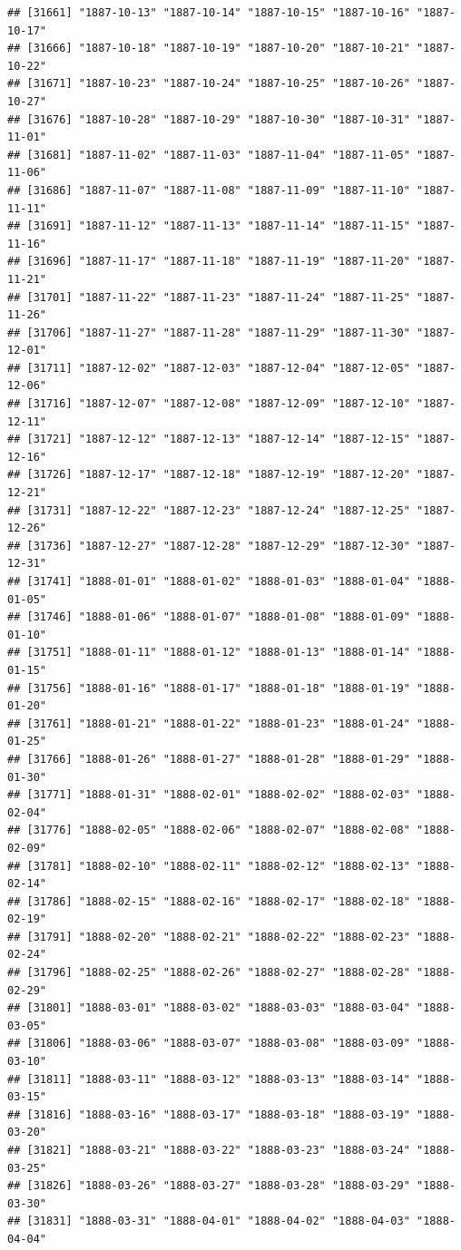 \documentclass{article}\usepackage[]{graphicx}\usepackage[]{color}
\makeatletter
\newenvironment{kframe}{%
 \def\at@end@of@kframe{}%
 \ifinner\ifhmode%
  \def\at@end@of@kframe{\end{minipage}}%
  \begin{minipage}{\columnwidth}%
 \fi\fi%
 \def\FrameCommand##1{\hskip\@totalleftmargin \hskip-\fboxsep
 \colorbox{shadecolor}{##1}\hskip-\fboxsep
     \hskip-\linewidth \hskip-\@totalleftmargin \hskip\columnwidth}%
 \MakeFramed {\advance\hsize-\width
   \@totalleftmargin\z@ \linewidth\hsize
   \@setminipage}}%
 {\par\unskip\endMakeFramed%
 \at@end@of@kframe}
\newenvironment{knitrout}{}{} %
\makeatother
\begin{document}
\begin{description}
\begin{knitrout}
\begin{kframe}
\begin{verbatim}
## [31661] "1887-10-13" "1887-10-14" "1887-10-15" "1887-10-16" "1887-10-17"
## [31666] "1887-10-18" "1887-10-19" "1887-10-20" "1887-10-21" "1887-10-22"
## [31671] "1887-10-23" "1887-10-24" "1887-10-25" "1887-10-26" "1887-10-27"
## [31676] "1887-10-28" "1887-10-29" "1887-10-30" "1887-10-31" "1887-11-01"
## [31681] "1887-11-02" "1887-11-03" "1887-11-04" "1887-11-05" "1887-11-06"
## [31686] "1887-11-07" "1887-11-08" "1887-11-09" "1887-11-10" "1887-11-11"
## [31691] "1887-11-12" "1887-11-13" "1887-11-14" "1887-11-15" "1887-11-16"
## [31696] "1887-11-17" "1887-11-18" "1887-11-19" "1887-11-20" "1887-11-21"
## [31701] "1887-11-22" "1887-11-23" "1887-11-24" "1887-11-25" "1887-11-26"
## [31706] "1887-11-27" "1887-11-28" "1887-11-29" "1887-11-30" "1887-12-01"
## [31711] "1887-12-02" "1887-12-03" "1887-12-04" "1887-12-05" "1887-12-06"
## [31716] "1887-12-07" "1887-12-08" "1887-12-09" "1887-12-10" "1887-12-11"
## [31721] "1887-12-12" "1887-12-13" "1887-12-14" "1887-12-15" "1887-12-16"
## [31726] "1887-12-17" "1887-12-18" "1887-12-19" "1887-12-20" "1887-12-21"
## [31731] "1887-12-22" "1887-12-23" "1887-12-24" "1887-12-25" "1887-12-26"
## [31736] "1887-12-27" "1887-12-28" "1887-12-29" "1887-12-30" "1887-12-31"
## [31741] "1888-01-01" "1888-01-02" "1888-01-03" "1888-01-04" "1888-01-05"
## [31746] "1888-01-06" "1888-01-07" "1888-01-08" "1888-01-09" "1888-01-10"
## [31751] "1888-01-11" "1888-01-12" "1888-01-13" "1888-01-14" "1888-01-15"
## [31756] "1888-01-16" "1888-01-17" "1888-01-18" "1888-01-19" "1888-01-20"
## [31761] "1888-01-21" "1888-01-22" "1888-01-23" "1888-01-24" "1888-01-25"
## [31766] "1888-01-26" "1888-01-27" "1888-01-28" "1888-01-29" "1888-01-30"
## [31771] "1888-01-31" "1888-02-01" "1888-02-02" "1888-02-03" "1888-02-04"
## [31776] "1888-02-05" "1888-02-06" "1888-02-07" "1888-02-08" "1888-02-09"
## [31781] "1888-02-10" "1888-02-11" "1888-02-12" "1888-02-13" "1888-02-14"
## [31786] "1888-02-15" "1888-02-16" "1888-02-17" "1888-02-18" "1888-02-19"
## [31791] "1888-02-20" "1888-02-21" "1888-02-22" "1888-02-23" "1888-02-24"
## [31796] "1888-02-25" "1888-02-26" "1888-02-27" "1888-02-28" "1888-02-29"
## [31801] "1888-03-01" "1888-03-02" "1888-03-03" "1888-03-04" "1888-03-05"
## [31806] "1888-03-06" "1888-03-07" "1888-03-08" "1888-03-09" "1888-03-10"
## [31811] "1888-03-11" "1888-03-12" "1888-03-13" "1888-03-14" "1888-03-15"
## [31816] "1888-03-16" "1888-03-17" "1888-03-18" "1888-03-19" "1888-03-20"
## [31821] "1888-03-21" "1888-03-22" "1888-03-23" "1888-03-24" "1888-03-25"
## [31826] "1888-03-26" "1888-03-27" "1888-03-28" "1888-03-29" "1888-03-30"
## [31831] "1888-03-31" "1888-04-01" "1888-04-02" "1888-04-03" "1888-04-04"

\end{verbatim}
\end{kframe}
\end{knitrout}
\end{description}
\end{document}
